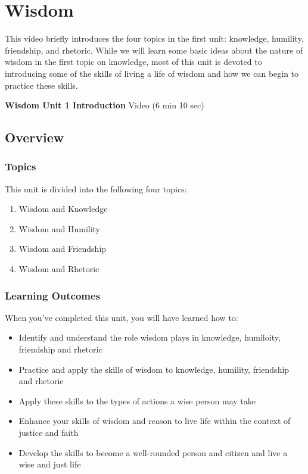 \documentclass[
]{book}
\providecommand{\tightlist}{%
  \setlength{\itemsep}{0pt}\setlength{\parskip}{0pt}}
\begin{document}
\hypertarget{wisdom}{%
\chapter{Wisdom}\label{wisdom}}

This video briefly introduces the four topics in the first unit: knowledge, humility, friendship, and rhetoric. While we will learn some basic ideas about the nature of wisdom in the first topic on knowledge, most of this unit is devoted to introducing some of the skills of living a life of wisdom and how we can begin to practice these skills.

\textbf{Wisdom Unit 1 Introduction} Video (6 min 10 sec)

\hypertarget{overview}{%
\section*{Overview}\label{overview}}

\hypertarget{topics}{%
\subsection*{Topics}\label{topics}}

This unit is divided into the following four topics:

\begin{enumerate}
\def\labelenumi{\arabic{enumi}.}
\tightlist
\item
  Wisdom and Knowledge
\item
  Wisdom and Humility
\item
  Wisdom and Friendship
\item
  Wisdom and Rhetoric
\end{enumerate}

\hypertarget{learning-outcomes}{%
\subsection*{Learning Outcomes}\label{learning-outcomes}}

When you've completed this unit, you will have learned how to:

\begin{itemize}
\tightlist
\item
  Identify and understand the role wisdom plays in knowledge, humiloity, friendship and rhetoric
\item
  Practice and apply the skills of wisdom to knowledge, humility, friendship and rhetoric
\item
  Apply these skills to the types of actions a wise person may take
\item
  Enhance your skills of wisdom and reason to live life within the context of justice and faith
\item
  Develop the skills to become a well-rounded person and citizen and live a wise and just life
\end{itemize}
\end{document}

